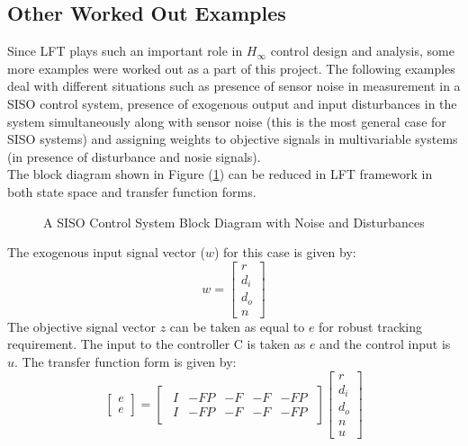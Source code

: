 \documentclass[a4paper,12pt]{article}
\begin{document}
			\subsection{Other Worked Out Examples} Since LFT plays such an important role in $H_{\infty}$ control design and analysis, some more examples were worked out as a part of this project. The following examples deal with different situations such as presence of sensor noise in measurement in a SISO control system, presence of exogenous output and input disturbances in the system simultaneously along with sensor noise (this is the most general case for SISO systems) and assigning weights to objective signals in multivariable systems (in presence of disturbance and nosie signals). 
			\\The block diagram shown in Figure (\ref{example1}) can be reduced in LFT framework in both state space and transfer function forms.
	\begin{figure}[H]
 
			  \centering
			  
			  
			  \caption{A SISO Control System Block Diagram with Noise and Disturbances}
			 \label{example1}
		\end{figure}			 
			 The exogenous input signal vector ($w$) for this case is given by:
			\[w=
			\begin{bmatrix}
			r \\ d_{i} \\ d_{o} \\ n
			\end{bmatrix}
			\]
			The objective signal vector $z$ can be taken as equal to $e$ for robust tracking requirement. The input to the controller C is taken as $e$ and the control input is $u$. The transfer function form is given by:
			\[
			\begin{bmatrix}
			e \\ \hline e
			\end{bmatrix}
			=
			\begin{bmatrix}
				\begin{array}{cccc|c}
				I & -FP & -F & -F & -FP\\ \hline
				I & -FP & -F & -F & -FP
				\end{array}
			\end{bmatrix}
			\begin{bmatrix}
			r \\ d_{i} \\ d_{o} \\ n \\ \hline u
			\end{bmatrix}
			\]
\end{document}
